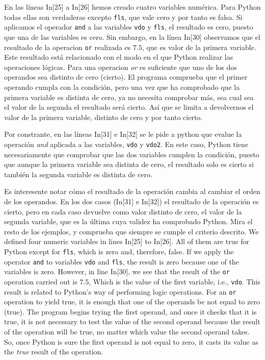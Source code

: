 \begin{paracol}{2}
En las líneas In[25] a In[26] hemos creado cuatro variables numérica. Para Python todas ellas son verdaderas excepto \texttt{fls}, que vale cero y por tanto es falsa. Si aplicamos el operador \texttt{and} a las variables \texttt{vdo} y \texttt{fls}, el resultado es cero, puesto que una de las variables es cero. Sin embargo, en la línea In[30] observamos que el resultado de la operacion \texttt{or} realizada es $7.5$, que es valor de la primera variable. Este resultado está relacionado con el modo en el que Python realizar las operaciones lógicas. Para una operacion \emph{or} es suficiente que uno de los dos operandos sea distinto de cero (cierto). El programa comprueba que el primer operando cumpla con la condición, pero una vez que ha comprobado que la primera variable es distinta de cero, ya no necesita comprobar más, sea cual sea el valor de la segunda el resultado será cierto. Así que se limita a devolvernos el valor de la primera variable, distinto de cero y por tanto cierto.

Por constrante, en las líneas In[31] e In[32] se le pide a python que evalue la operación \emph{and} aplicada a las variables, \texttt{vdo} y \texttt{vdo2}. En este caso, Python tiene necesariamente que comprobar que las dos variables cumplen la condición, puesto que aunque la primera variable sea distinta de cero, el resultado solo es cierto si también la segunda variable es distinta de cero. 

Es interesente notar cómo el resultado de la operación cambia al cambiar el orden de los operandos. En los dos casos (In[31] e In[32]) el resultado de la operación es cierto, pero en cada caso devuelve como valor distinto de cero, el valor de la segunda variable, que es la última cuya validez ha comprobado Python. Mira el resto de los ejemplos, y comprueba que siempre se cumple el criterio descrito.
\switchcolumn
We defined four numeric variables in lines In[25] to In[26]. All of them are true for Python except for \texttt{fls}, which is zero and, therefore, false. If we apply the operator \texttt{and} to variables \texttt{vdo} and \texttt{fls}, the result is zero because one of the variables is zero. However, in line In[30], we see that the result of the \texttt{or} operation carried out is $7.5$, Which is the value of the first variable, i.e., \texttt{vdo}. This result is related to Python's way of performing logic operations. For an  \texttt{or} operation to yield true, it is enough that one of the operands be not equal to zero (true). The program begins trying the first operand, and once it checks that it is true, it is not necessary to test the value of the second operand because the result of the operation will be true, no matter which value the second operand takes. So, once Python is sure the first operand is not equal to zero, it casts its value as the \emph{true} result of the operation.


\end{paracol}
